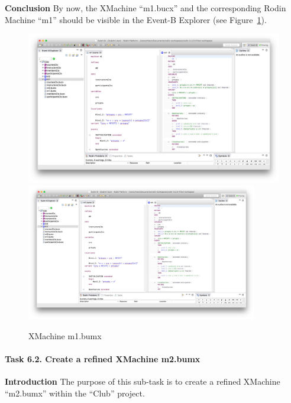 \textbf{Conclusion} By now, the XMachine ``m1.bucx'' and the corresponding Rodin Machine ``m1'' should be visible in the Event-B Explorer (see Figure~\ref{fig:M1}).
  \begin{figure}[!htbp]
    \centering
    \ifplastex
    \includegraphics[width=512]{figures/M1}
    \else
    \includegraphics[width=0.9\textwidth]{figures/M1}
    \fi
    \caption{XMachine m1.bumx}
    \label{fig:M1}
  \end{figure}

\paragraph{Task 6.2. Create a refined XMachine m2.bumx}
\textbf{Introduction} The purpose of this sub-task is to create a refined XMachine ``m2.bumx'' within the ``Club'' project.

